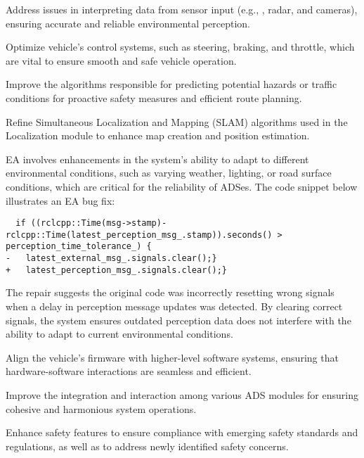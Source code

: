 Address issues in interpreting data from sensor input (e.g., \lidar, radar, and cameras), ensuring accurate and reliable environmental perception.

Optimize vehicle's control systems, such as steering, braking, and throttle, which are vital to ensure smooth and safe vehicle operation.

Improve the algorithms responsible for predicting potential hazards or traffic conditions for proactive safety measures and efficient route planning.

Refine Simultaneous Localization and Mapping (SLAM) algorithms used in the Localization module to enhance map creation and position estimation. 

EA involves enhancements in the system's ability to adapt to different environmental conditions, such as varying weather, lighting, or road surface conditions, which are critical for the reliability of ADSes.
The code snippet below illustrates an EA bug fix:

\begin{lstlisting}
  if ((rclcpp::Time(msg->stamp)-rclcpp::Time(latest_perception_msg_.stamp)).seconds() > perception_time_tolerance_) {
-   latest_external_msg_.signals.clear();}
+   latest_perception_msg_.signals.clear();}
\end{lstlisting}

\noindent 
The repair suggests the original code was incorrectly resetting wrong signals when a delay in perception message updates was detected. By clearing correct signals, the system ensures outdated perception data does not interfere with the ability to adapt to current environmental conditions.

Align the vehicle's firmware with higher-level software systems, ensuring that hardware-software interactions are seamless and efficient.

Improve the integration and interaction among various ADS modules for ensuring cohesive and harmonious system operations.

Enhance safety features to ensure compliance with emerging safety standards and regulations, as well as to address newly identified safety concerns.

